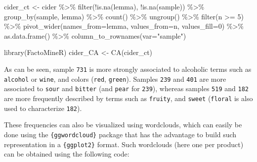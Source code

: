 \documentclass[
]{book}
\newenvironment{Shaded}{\begin{snugshade}}{\end{snugshade}}
\newcommand{\AttributeTok}[1]{\textcolor[rgb]{0.77,0.63,0.00}{#1}}
\newcommand{\DecValTok}[1]{\textcolor[rgb]{0.00,0.00,0.81}{#1}}
\newcommand{\FunctionTok}[1]{\textcolor[rgb]{0.00,0.00,0.00}{#1}}
\newcommand{\NormalTok}[1]{#1}
\newcommand{\OtherTok}[1]{\textcolor[rgb]{0.56,0.35,0.01}{#1}}
\newcommand{\SpecialCharTok}[1]{\textcolor[rgb]{0.00,0.00,0.00}{#1}}
\newcommand{\StringTok}[1]{\textcolor[rgb]{0.31,0.60,0.02}{#1}}
\begin{document}
\begin{Shaded}
\begin{Highlighting}[]
\NormalTok{cider\_ct }\OtherTok{\textless{}{-}}\NormalTok{ cider }\SpecialCharTok{\%\textgreater{}\%} 
  \FunctionTok{filter}\NormalTok{(}\SpecialCharTok{!}\FunctionTok{is.na}\NormalTok{(lemma), }\SpecialCharTok{!}\FunctionTok{is.na}\NormalTok{(sample)) }\SpecialCharTok{\%\textgreater{}\%} 
  \FunctionTok{group\_by}\NormalTok{(sample, lemma) }\SpecialCharTok{\%\textgreater{}\%} 
  \FunctionTok{count}\NormalTok{() }\SpecialCharTok{\%\textgreater{}\%} 
  \FunctionTok{ungroup}\NormalTok{() }\SpecialCharTok{\%\textgreater{}\%} 
  \FunctionTok{filter}\NormalTok{(n }\SpecialCharTok{\textgreater{}=} \DecValTok{5}\NormalTok{) }\SpecialCharTok{\%\textgreater{}\%} 
  \FunctionTok{pivot\_wider}\NormalTok{(}\AttributeTok{names\_from=}\NormalTok{lemma, }\AttributeTok{values\_from=}\NormalTok{n, }\AttributeTok{values\_fill=}\DecValTok{0}\NormalTok{) }\SpecialCharTok{\%\textgreater{}\%} 
  \FunctionTok{as.data.frame}\NormalTok{() }\SpecialCharTok{\%\textgreater{}\%} 
  \FunctionTok{column\_to\_rownames}\NormalTok{(}\AttributeTok{var=}\StringTok{"sample"}\NormalTok{)}

\FunctionTok{library}\NormalTok{(FactoMineR)}
\NormalTok{cider\_CA }\OtherTok{\textless{}{-}} \FunctionTok{CA}\NormalTok{(cider\_ct)}
\end{Highlighting}
\end{Shaded}

As can be seen, sample \texttt{731} is more strongly associated to alcoholic terms such as \texttt{alcohol} or \texttt{wine}, and colors (\texttt{red}, \texttt{green}). Samples \texttt{239} and \texttt{401} are more associated to \texttt{sour} and \texttt{bitter} (and \texttt{pear} for \texttt{239}), whereas samples \texttt{519} and \texttt{182} are more frequently described by terms such as \texttt{fruity}, and \texttt{sweet} (\texttt{floral} is also used to characterize \texttt{182}).

These frequencies can also be visualized using wordclouds, which can easily be done using the \texttt{\{ggwordcloud\}} package that has the advantage to build such representation in a \texttt{\{ggplot2\}} format. Such wordclouds (here one per product) can be obtained using the following code:
\end{document}
